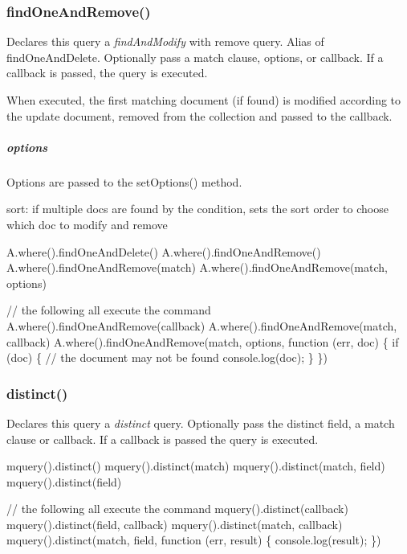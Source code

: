 \subsubsection*{find\+One\+And\+Remove()}

Declares this query a {\itshape find\+And\+Modify} with remove query. Alias of find\+One\+And\+Delete. Optionally pass a match clause, options, or callback. If a callback is passed, the query is executed.

When executed, the first matching document (if found) is modified according to the update document, removed from the collection and passed to the callback.

\subparagraph*{options}

Options are passed to the {\ttfamily set\+Options()} method.


\begin{DoxyItemize}
\item {\ttfamily sort}\+: if multiple docs are found by the condition, sets the sort order to choose which doc to modify and remove
\end{DoxyItemize}


\begin{DoxyCode}
A.where().findOneAndDelete()
A.where().findOneAndRemove()
A.where().findOneAndRemove(match)
A.where().findOneAndRemove(match, options)

// the following all execute the command
A.where().findOneAndRemove(callback)
A.where().findOneAndRemove(match, callback)
A.where().findOneAndRemove(match, options, function (err, doc) \{
  if (doc) \{
    // the document may not be found
    console.log(doc);
  \}
\})
\end{DoxyCode}


\subsubsection*{distinct()}

Declares this query a {\itshape distinct} query. Optionally pass the distinct field, a match clause or callback. If a callback is passed the query is executed.


\begin{DoxyCode}
mquery().distinct()
mquery().distinct(match)
mquery().distinct(match, field)
mquery().distinct(field)

// the following all execute the command
mquery().distinct(callback)
mquery().distinct(field, callback)
mquery().distinct(match, callback)
mquery().distinct(match, field, function (err, result) \{
  console.log(result);
\})
\end{DoxyCode}


